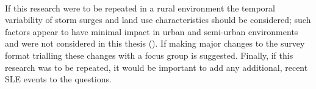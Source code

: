 \paragraph{}
If this research were to be repeated in a rural environment the temporal variability of storm surges and land use characteristics should be considered; such factors appear to have minimal impact in urban and semi-urban environments and were not considered in this thesis (\cite{hoffken_effects_2020}). If making major changes to the survey format trialling these changes with a focus group is suggested. Finally, if this research was to be repeated, it would be important to add any additional, recent SLE events to the questions. 



